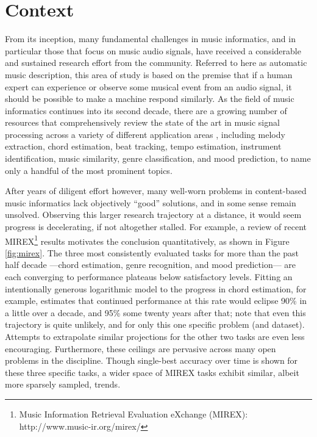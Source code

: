 

\graphicspath{{2/figures/}}

\chapter{Context}
\label{chp:context}


From its inception, many fundamental challenges in music informatics, and in particular those that focus on music audio signals, have received a considerable and sustained research effort from the community.
Referred to here as automatic music description, this area of study is based on the premise that if a human expert can experience or observe some musical event from an audio signal, it should be possible to make a machine respond similarly.
As the field of music informatics continues into its second decade, there are a growing number of resources that comprehensively review the state of the art in music signal processing across a variety of different application areas \cite{Klapuri2006,Casey2008,Mueller2011a}, including melody extraction, chord estimation, beat tracking, tempo estimation, instrument identification, music similarity, genre classification, and mood prediction, to name only a handful of the most prominent topics.

After years of diligent effort however, many well-worn problems in content-based music informatics lack objectively ``good'' solutions, and in some sense remain unsolved.
Observing this larger research trajectory at a distance, it would seem progress is decelerating, if not altogether stalled.
For example, a review of recent MIREX\footnote{Music Information Retrieval Evaluation eXchange (MIREX): {http://www.music-ir.org/mirex/}} results motivates the conclusion quantitatively, as shown in Figure \ref{fig:mirex}.
The three most consistently evaluated tasks for more than the past half decade ---chord estimation, genre recognition, and mood prediction--- are each converging to performance plateaus below satisfactory levels.
Fitting an intentionally generous logarithmic model to the progress in chord estimation, for example, estimates that continued performance at this rate would eclipse 90\% in a little over a decade, and 95\% some twenty years after that; note that even this trajectory is quite unlikely, and for only this one specific problem (and dataset).
Attempts to extrapolate similar projections for the other two tasks are even less encouraging.
Furthermore, these ceilings are pervasive across many open problems in the discipline.
Though single-best accuracy over time is shown for these three specific tasks, a wider space of MIREX tasks exhibit similar, albeit more sparsely sampled, trends.

